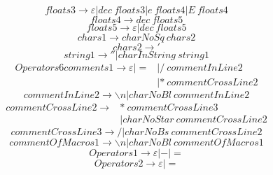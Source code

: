 \documentclass{article}
\begin{document}
\begin{equation}
	floats3 \rightarrow \varepsilon | dec \ floats3 | e \ floats4 | E \ floats4
\end{equation}
\begin{equation}
	floats4 \rightarrow dec \ floats5
\end{equation}
\begin{equation}
	floats5 \rightarrow \varepsilon | dec \ floats5
\end{equation}
\begin{equation}
	chars1 \rightarrow charNoSq \ chars2
\end{equation}
\begin{equation}
	chars2 \rightarrow '
\end{equation}
\begin{equation}
	string1 \rightarrow '' | charInString \ string1
\end{equation}
\begin{equation}
	\begin{aligned}
		Operators6comments1 \rightarrow \varepsilon | = & | / \ commentInLine2   \\
		                                                & |* \ commentCrossLine2
	\end{aligned}
\end{equation}
\begin{equation}
	commentInLine2 \rightarrow \backslash n | charNoBl \ commentInLine2
\end{equation}
\begin{equation}
	\begin{aligned}
		commentCrossLine2 \rightarrow & * \ commentCrossLine3            \\
		                              & | charNoStar \ commentCrossLine2
	\end{aligned}
\end{equation}
\begin{equation}
	commentCrossLine3 \rightarrow / | charNoBs \ commentCrossLine2
\end{equation}
\begin{equation}
	commentOfMacros1 \rightarrow \backslash n | charNoBl \ commentOfMacros1
\end{equation}
\begin{equation}
	Operators1 \rightarrow \varepsilon | - | =
\end{equation}
\begin{equation}
	Operators2 \rightarrow \varepsilon | =
\end{equation}
\end{document}
